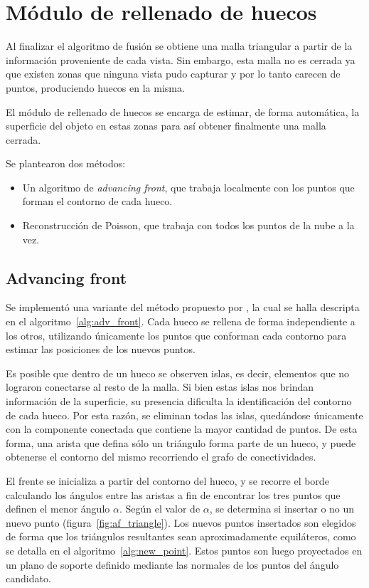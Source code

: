 \section{Módulo de rellenado de huecos}
	Al finalizar el algoritmo de fusión se obtiene una malla triangular a partir
	de la información proveniente de cada vista.
	Sin embargo, esta malla no es cerrada ya que existen zonas que ninguna
	vista pudo capturar y por lo tanto carecen de puntos, produciendo huecos en la misma.

	El módulo de rellenado de huecos se encarga de estimar, de forma automática, la superficie del
	objeto en estas zonas para así obtener finalmente una malla cerrada.

	Se plantearon dos métodos:
	\begin{itemize}
		\item Un algoritmo de \emph{advancing front}, que trabaja localmente con los puntos que forman el contorno de cada hueco.
		\item Reconstrucción de Poisson, que trabaja con todos los puntos de la nube a la vez. 
	\end{itemize}


	\subsection{\label{part:adv_font_implementación}Advancing front}
		Se implementó una variante del método propuesto por \cite{advance_front},
		la cual se halla descripta en el algoritmo~\ref{alg:adv_front}.
		Cada hueco se rellena de forma independiente a los otros,
		utilizando únicamente los puntos que conforman cada contorno para estimar
		las posiciones de los nuevos puntos.

		Es posible que dentro de un hueco se observen islas, es decir,
		elementos que no lograron conectarse al resto de la malla.
		Si bien estas islas nos brindan información de la superficie,
		su presencia dificulta la identificación del contorno de cada hueco.
		Por esta razón, se eliminan todas las islas,
		quedándose únicamente con la componente conectada que contiene
		la mayor cantidad de puntos.
		De esta forma, una arista que defina sólo un triángulo forma parte de un hueco,
		y puede obtenerse el contorno del mismo recorriendo el grafo de conectividades. 

		El frente se inicializa a partir del contorno del hueco, y se recorre el borde
		calculando los ángulos entre las aristas a fin de encontrar los tres puntos
		que definen el menor ángulo $\alpha$. Según el valor de $\alpha$, se determina
		si insertar o no un nuevo punto (figura~\ref{fig:af_triangle}).
		Los nuevos puntos insertados son elegidos de forma que los triángulos resultantes sean
		aproximadamente equiláteros, como se detalla en el algoritmo~\ref{alg:new_point}.
		Estos puntos son luego proyectados en un plano de soporte definido
		mediante las normales de los puntos del ángulo candidato.

